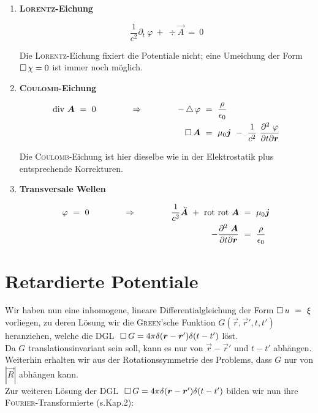 \begin{enumerate}[label=\roman*)]

\item \textbf{\textsc{Lorentz}-Eichung}

\begin{equation*}
\frac{1}{c^2} \partial_t \ \varphi \ + \ \div\vec{A} \ = \ 0
\end{equation*}

Die \textsc{Lorentz}-Eichung fixiert die Potentiale nicht; eine Umeichung der Form $\mathop{{}\Box}\nolimits\chi=0$ ist immer noch möglich.

\item \textbf{\textsc{Coulomb}-Eichung}

\begin{align*}
\div\vec{A} \ = \ 0 \qquad\qquad \Rightarrow \qquad\qquad -\laplace\varphi \ &= \ \frac{\rho}{\epsilon_0}\\
\Dalembert\vec{A} \ &= \ \mu_0\vec{j} \  - \ \frac{1}{c^2}\ \frac{\partial^2 \ \varphi}{\partial t \partial \vec{r}} 
\end{align*}

Die \textsc{Coulomb}-Eichung ist hier dieselbe wie in der Elektrostatik plus entsprechende Korrekturen.

\item \textbf{Transversale Wellen}

\begin{align*}
\varphi \ = \ 0 \qquad\qquad\Rightarrow\qquad\qquad \frac{1}{c^2}\ddot{\vec{A}}\ + \ \rot\rot\vec{A} \ &= \ \mu_0\vec{j}\\
- \frac{\partial^2 \ \vec{A}}{\partial t \partial \vec{r}}  \ &= \ \frac{\rho}{\epsilon_0} 
\end{align*}
\end{enumerate}

\section{Retardierte Potentiale}

Wir haben nun eine inhomogene, lineare Differentialgleichung der Form $\mathop{{}\Box}\nolimits u \ = \ \xi$ vorliegen, zu deren Lösung wir die \textsc{Green}'sche Funktion $G(\vec{r},\vec{r}',t,t')$ heranziehen, welche die DGL $\;\mathop{{}\Box}\nolimits G = 4\pi \delta(\bm{r}-\bm{r}')\delta(t-t')$ löst.\\
Da $G$ translationsinvariant sein soll, kann es nur von $\vec{r}-\vec{r}'$ und $t-t'$ abhängen. Weiterhin erhalten wir aus der Rotationssymmetrie des Problems, dass $G$ nur von $|\vec{R}|$ abhängen kann.\\
Zur weiteren Lösung der DGL $\; \mathop{{}\Box}\nolimits G = 4\pi\delta(\bm{r}-\bm{r}')\delta(t-t')$ bilden wir nun ihre \textsc{Fourier}-Transformierte (s.Kap.2):

